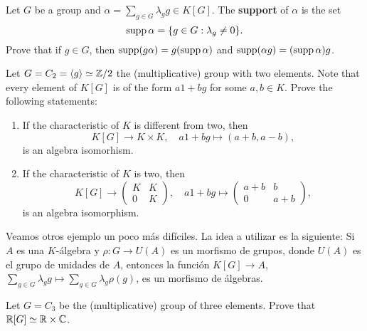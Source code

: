 \begin{exercise}
	Let $G$ be a group and $\alpha=\sum_{g\in G}\lambda_gg\in K[G]$.  
	The \textbf{support} of $\alpha$ is the set 
	\[
		\operatorname{supp}\alpha=\{g\in G:\lambda_g\ne 0\}.
	\]
	Prove that if $g\in G$, then 
	$\operatorname{supp}(g\alpha)=g(\operatorname{supp}\alpha)$ and $\operatorname{supp}(\alpha g)=(\operatorname{supp}\alpha)g$.
\end{exercise}


\begin{exercise}
	Let $G=C_2=\langle g\rangle\simeq\mathbb{Z}/2$ the (multiplicative) 
	group with two elements. Note that every element of $K[G]$ is of the form
	$a1+bg$ for some $a,b\in K$. Prove the following statements:
	\begin{enumerate}
	    \item If the characteristic of $K$ is different from two, then 
	    \[
		K[G]\to K\times K,
		\quad
		a1+bg\mapsto (a+b,a-b),
	\]
	is an algebra isomorhism. 
	\item If the characteristic of $K$ is two, then 
	\[
	K[G]\to \begin{pmatrix}
			K & K\\
			0 & K
		\end{pmatrix},
		\quad
		a1+bg\mapsto\begin{pmatrix}
			a+b & b\\
			0 & a+b
		\end{pmatrix},
	\]
	is an algebra isomorphism. 
	\end{enumerate}
\end{exercise}

Veamos otros ejemplo un poco más difíciles. La idea a utilizar es la siguiente:
Si $A$ es una $K$-álgebra y $\rho\colon G\to U(A)$ es un morfismo de grupos,
donde $U(A)$ es el grupo de unidades de $A$, entonces la función $K[G]\to A$,
$\sum_{g\in G}\lambda_gg\mapsto\sum_{g\in G}\lambda_g\rho(g)$, es un morfismo
de álgebras.

\begin{exercise}
	Let $G=C_3$ be the (multiplicative) group of three elements. Prove that
	$\mathbb{R}[G]\simeq\mathbb{R}\times\mathbb{C}$.
\end{exercise}

